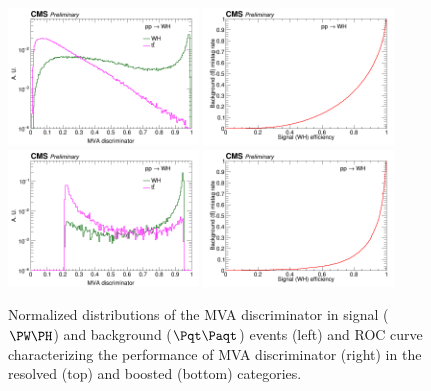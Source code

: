 \documentclass[a4paper,11pt]{article}
\newcommand{\Pt}{{{\Pqt}}\xspace}
\newcommand{\PAt}{{{{\Paqt}}}\xspace}
\begin{document}
\begin{figure}[hbtp]
\begin{center}
\includegraphics[width=0.45\textwidth]{Figures/RECO/Plot_WH_MVA_WH_fast_resolved.png}
\includegraphics[width=0.45\textwidth]{Figures/RECO/ROC_plot_TT_MVA_resolved.png}
\includegraphics[width=0.45\textwidth]{Figures/RECO/Plot_WH_MVA_WH_fast_boosted.png}
\includegraphics[width=0.45\textwidth]{Figures/RECO/ROC_plot_TT_MVA_boosted.png}
\end{center}
\caption{
Normalized distributions of the MVA discriminator in signal ($\PW\PH$) and background ($\Pt\PAt$) events (left) and ROC curve characterizing the performance of MVA discriminator (right) in the resolved (top) and boosted (bottom) categories.
}
\label{fig:MVA}
\end{figure}
\end{document}
